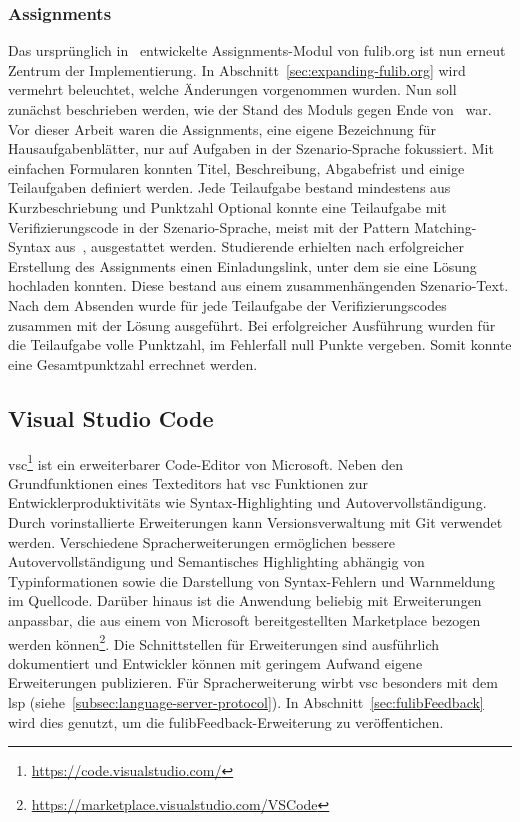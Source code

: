 \subsubsection{Assignments}
Das ursprünglich in~\cite{bachelor-thesis} entwickelte Assignments-Modul von fulib.org ist nun erneut Zentrum der Implementierung.
In Abschnitt~\ref{sec:expanding-fulib.org} wird vermehrt beleuchtet, welche Änderungen vorgenommen wurden.
Nun soll zunächst beschrieben werden, wie der Stand des Moduls gegen Ende von~\cite{bachelor-thesis} war.
Vor dieser Arbeit waren die Assignments, eine eigene Bezeichnung für Hausaufgabenblätter, nur auf Aufgaben in der Szenario-Sprache fokussiert.
Mit einfachen Formularen konnten Titel, Beschreibung, Abgabefrist und einige Teilaufgaben definiert werden.
Jede Teilaufgabe bestand mindestens aus Kurzbeschriebung und Punktzahl
Optional konnte eine Teilaufgabe mit Verifizierungscode in der Szenario-Sprache, meist mit der Pattern Matching-Syntax aus~\cite{bachelor-thesis}, ausgestattet werden.
Studierende erhielten nach erfolgreicher Erstellung des Assignments einen Einladungslink, unter dem sie eine Lösung hochladen konnten.
Diese bestand aus einem zusammenhängenden Szenario-Text.
Nach dem Absenden wurde für jede Teilaufgabe der Verifizierungscodes zusammen mit der Lösung ausgeführt.
Bei erfolgreicher Ausführung wurden für die Teilaufgabe volle Punktzahl, im Fehlerfall null Punkte vergeben.
Somit konnte eine Gesamtpunktzahl errechnet werden.

\subsection{Visual Studio Code}\label{subsec:visual-studio-code}

\ac{vsc}\footnote{\url{https://code.visualstudio.com/}} ist ein erweiterbarer Code-Editor von Microsoft.
Neben den Grundfunktionen eines Texteditors hat \ac{vsc} Funktionen zur Entwicklerproduktivitäts wie Syntax-Highlighting und Autovervollständigung.
Durch vorinstallierte Erweiterungen kann Versionsverwaltung mit Git verwendet werden.
Verschiedene Spracherweiterungen ermöglichen bessere Autovervollständigung und Semantisches Highlighting abhängig von Typinformationen sowie die Darstellung von Syntax-Fehlern und Warnmeldung im Quellcode.
Darüber hinaus ist die Anwendung beliebig mit Erweiterungen anpassbar, die aus einem von Microsoft bereitgestellten Marketplace bezogen werden können\footnote{\url{https://marketplace.visualstudio.com/VSCode}}.
Die Schnittstellen für Erweiterungen sind ausführlich dokumentiert und Entwickler können mit geringem Aufwand eigene Erweiterungen publizieren.
Für Spracherweiterung wirbt \ac{vsc} besonders mit dem \ac{lsp} (siehe~\ref{subsec:language-server-protocol}).
In Abschnitt~\ref{sec:fulibFeedback} wird dies genutzt, um die fulibFeedback-Erweiterung zu veröffentichen.

